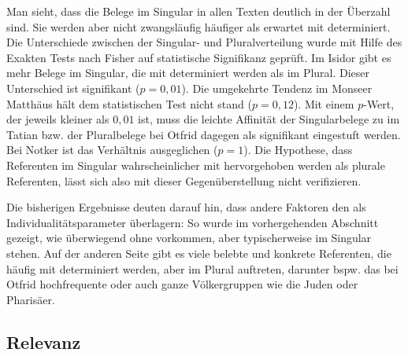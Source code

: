 Man sieht, dass die Belege im Singular in allen Texten deutlich in der Überzahl sind. Sie werden aber nicht zwangsläufig häufiger als erwartet mit  determiniert. Die Unterschiede zwischen der Singular- und Pluralverteilung wurde mit Hilfe des Exakten Tests nach Fisher auf statistische Signifikanz geprüft. Im Isidor gibt es mehr Belege im Singular, die mit  determiniert werden als im Plural. Dieser Unterschied ist signifikant ($p=0,01$). Die umgekehrte Tendenz im Monseer Matthäus hält dem statistischen Test nicht stand ($p=0,12$). Mit einem $p$-Wert,
der jeweils kleiner als $0,01$ ist, muss die leichte Affinität der Singularbelege zu  im Tatian bzw. der Pluralbelege bei Otfrid dagegen als signifikant eingestuft werden. Bei Notker ist das Verhältnis ausgeglichen ($p=1$). Die Hypothese, dass Referenten im
Singular wahrscheinlicher mit  hervorgehoben werden als plurale
Referenten, lässt sich also mit dieser Gegenüberstellung nicht verifizieren. 

Die bisherigen Ergebnisse deuten darauf hin, dass andere Faktoren den  als Individualitätsparameter  überlagern: So wurde im vorhergehenden Abschnitt gezeigt, wie  überwiegend ohne  vorkommen, aber typischerweise im Singular stehen. Auf der anderen Seite gibt es viele belebte und konkrete Referenten, die häufig mit  determiniert werden, aber im Plural auftreten, darunter bspw. das bei Otfrid hochfrequente   oder auch ganze Völkergruppen wie die Juden oder Pharisäer.


\subsection{Relevanz}\label{sec:ergeb-relevanz}

